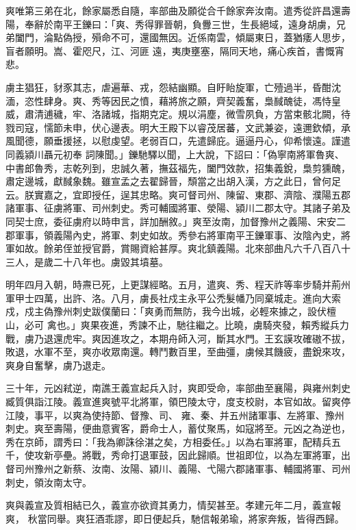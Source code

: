 \begin{pinyinscope}
 爽唯第三弟在北，餘家屬悉自隨，率部曲及願從合千餘家奔汝南。遣秀從許昌還壽陽，奉辭於南平王鑠曰：「爽、秀得罪晉朝，負釁三世，生長絕域，遠身胡虜，兄弟闔門，淪點偽授，殞命不可，還國無因。近係南雲，傾屬東日，蓋猶痿人思步，盲者願明。嵩、霍咫尺，江、河匪
 遠，夷庚壅塞，隔同天地，痛心疾首，書慨宵悲。



 虜主猖狂，豺豕其志，虐遍華、戎，怨結幽顯。自盱眙旋軍，亡殪過半，昏酣沈湎，恣性肆身。爽、秀等因民之憤，藉將旅之願，齊契義奮，梟馘醜徒，馮恃皇威，肅清逋穢，牢、洛諸城，指期克定。規以涓塵，微雪夙負，方當束骸北闕，待戮司寇，懦節未申，伏心邊表。明大王殿下以睿茂居蕃，文武兼姿，遠邇欽傾，承風聞德，願垂援拯，以慰虔望。老弱百口，先遣歸庇。逼逼丹心，仰希懷遠。謹遣同義潁川聶元初奉
 詞陳聞。」鑠馳驛以聞，上大說，下詔曰：「偽寧南將軍魯爽、中書郎魯秀，志乾列到，忠誠久著，撫茲福先，闔門效款，招集義銳，梟剪獯醜，肅定邊城，獻馘象魏。雖宣孟之去翟歸晉，頹當之出胡入漢，方之此日，曾何足云。朕實嘉之，宜即授任，逞其忠略。爽可督司州、陳留、東郡、濟陰、濮陽五郡諸軍事、征虜將軍、司州刺史。秀可輔國將軍、滎陽、潁川二郡太守。其諸子弟及同契士庶，委征虜府以時申言，詳加酬敘。」爽至汝南，加督豫州之義陽、宋安二
 郡軍事，領義陽內史，將軍、刺史如故。秀參右將軍南平王鑠軍事、汝陰內史，將軍如故。餘弟侄並授官爵，賞賜資給甚厚。爽北鎮義陽。北來部曲凡六千八百八十三人，是歲二十八年也。虜毀其墳墓。



 明年四月入朝，時燾已死，上更謀經略。五月，遣爽、秀、程天祚等率步騎并荊州軍甲士四萬，出許、洛。八月，虜長社戍主永平公禿髮幡乃同棄城走。進向大索戍，戍主偽豫州刺史跋僕蘭曰：「爽勇而無防，我今出城，必輕來據之，設伏檀山，必可
 禽也。」爽果夜進，秀諫不止，馳往繼之。比曉，虜騎夾發，賴秀縱兵力戰，虜乃退還虎牢。爽因進攻之，本期舟師入河，斷其水門。王玄謨攻確磝不拔，敗退，水軍不至，爽亦收眾南還。轉鬥數百里，至曲彊，虜候其饑疲，盡銳來攻，爽身自奮擊，虜乃退走。



 三十年，元凶弒逆，南譙王義宣起兵入討，爽即受命，率部曲至襄陽，與雍州刺史臧質俱詣江陵。義宣進爽號平北將軍，領巴陵太守，度支校尉，本官如故。留爽停江陵，事平，以爽為使持節、督豫、司、
 雍、秦、并五州諸軍事、左將軍、豫州刺史。爽至壽陽，便曲意賓客，爵命士人，蓄仗聚馬，如寇將至。元凶之為逆也，秀在京師，謂秀曰：「我為卿誅徐湛之矣，方相委任。」以為右軍將軍，配精兵五千，使攻新亭壘。將戰，秀命打退軍鼓，因此歸順。世祖即位，以為左軍將軍，出督司州豫州之新蔡、汝南、汝陽、潁川、義陽、弋陽六郡諸軍事、輔國將軍、司州刺史，領汝南太守。



 爽與義宣及質相結已久，義宣亦欲資其勇力，情契甚至。孝建元年二月，義宣報爽，
 秋當同舉。爽狂酒乖謬，即日便起兵，馳信報弟瑜，將家奔叛，皆得西歸。




\end{pinyinscope}
